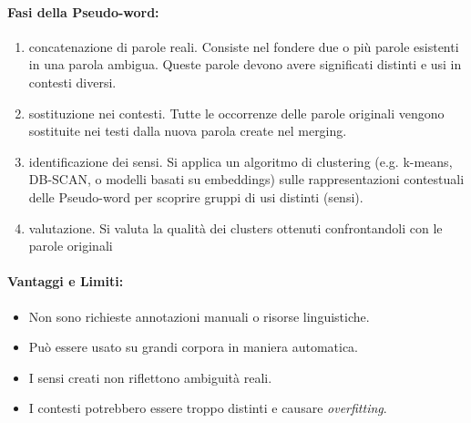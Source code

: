 
\paragraph{Fasi della Pseudo-word:}

\begin{enumerate}
  \item {} concatenazione di parole reali. Consiste nel fondere due o più parole esistenti in una parola ambigua. Queste parole devono avere significati distinti e usi in contesti diversi.
  \item {} sostituzione nei contesti. Tutte le occorrenze delle parole originali vengono sostituite nei testi dalla nuova parola create nel merging.
  \item {} identificazione dei sensi. Si applica un algoritmo di clustering (e.g. k-means, DB-SCAN, o modelli basati su embeddings) sulle rappresentazioni contestuali delle Pseudo-word per scoprire gruppi di usi distinti (sensi). 
  \item {} valutazione. Si valuta la qualità dei clusters ottenuti confrontandoli con le parole originali 
\end{enumerate}

\paragraph{Vantaggi e Limiti:}

\begin{itemize}
  \item [\textcolor{green}{\ding{51}}] Non sono richieste annotazioni manuali o risorse linguistiche.
      \item [\textcolor{green}{\ding{51}}] Può essere usato su grandi corpora in maniera automatica.
  \item [\textcolor{red}{\ding{55}}] I sensi creati non riflettono ambiguità reali. 
  \item [\textcolor{red}{\ding{55}}] I contesti potrebbero essere troppo distinti e causare \textit{overfitting}. 
\end{itemize}

